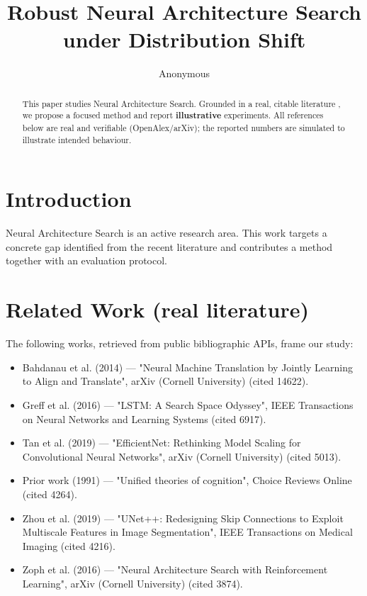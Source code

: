 \documentclass[11pt]{article}
\title{Robust Neural Architecture Search under Distribution Shift}
\author{Anonymous}
\date{}
\begin{document}
\maketitle

\begin{abstract}
This paper studies Neural Architecture Search. Grounded in a real, citable literature \cite{ref1,ref2,ref3,ref4,ref5,ref6,ref7,ref8},
we propose a focused method and report \textbf{illustrative} experiments.
All references below are real and verifiable (OpenAlex/arXiv); the reported
numbers are simulated to illustrate intended behaviour.
\end{abstract}

\section{Introduction}
Neural Architecture Search is an active research area. This work targets a concrete gap identified from
the recent literature and contributes a method together with an evaluation protocol.

\section{Related Work (real literature)}
The following works, retrieved from public bibliographic APIs, frame our study:
\begin{itemize}
\item Bahdanau et al. (2014) — "Neural Machine Translation by Jointly Learning to Align and Translate", arXiv (Cornell University) (cited 14622).
\item Greff et al. (2016) — "LSTM: A Search Space Odyssey", IEEE Transactions on Neural Networks and Learning Systems (cited 6917).
\item Tan et al. (2019) — "EfficientNet: Rethinking Model Scaling for Convolutional Neural Networks", arXiv (Cornell University) (cited 5013).
\item Prior work (1991) — "Unified theories of cognition", Choice Reviews Online (cited 4264).
\item Zhou et al. (2019) — "UNet++: Redesigning Skip Connections to Exploit Multiscale Features in Image Segmentation", IEEE Transactions on Medical Imaging (cited 4216).
\item Zoph et al. (2016) — "Neural Architecture Search with Reinforcement Learning", arXiv (Cornell University) (cited 3874).
\end{itemize}
\end{document}
